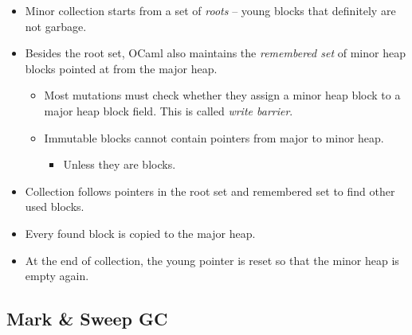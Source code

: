 \documentclass{beamer}
\newcommand{\tmem}[1]{{\em #1\/}}
\begin{document}
\begin{itemize}
  \item Minor collection starts from a set of {\tmem{roots}} -- young blocks
  that definitely are not garbage.
  
  \item Besides the root set, OCaml also maintains the {\tmem{remembered set}}
  of minor heap blocks pointed at from the major heap.
  \begin{itemize}
    \item Most mutations must check whether they assign a minor heap block to
    a major heap block field. This is called {\tmem{write barrier}}.
    
    \item Immutable blocks cannot contain pointers from major to minor heap.
    \begin{itemize}
      \item Unless they are {} blocks.
    \end{itemize}
  \end{itemize}
  \item Collection follows pointers in the root set and remembered set to find
  other used blocks.
  
  \item Every found block is copied to the major heap.
  
  \item At the end of collection, the young pointer is reset so that the minor
  heap is empty again.
\end{itemize}

\subsection{Mark \& Sweep GC}
\end{document}
